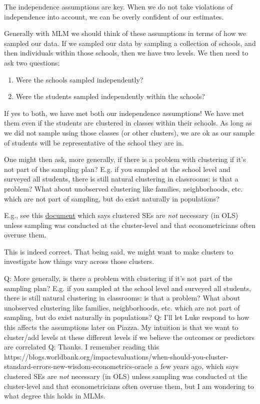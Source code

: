 \documentclass[
  letterpaper,
  DIV=11,
  numbers=noendperiod]{scrreprt}
\begin{document}
The independence assumptions are key. When we do not take violations of
independence into account, we can be overly confident of our estimates.

Generally with MLM we should think of these assumptions in terms of how
we sampled our data. If we sampled our data by sampling a collection of
schools, and then individuals within those schools, then we have two
levels. We then need to ask two questions:

\begin{enumerate}
\def\labelenumi{(\arabic{enumi})}
\item
  Were the schools sampled independently?
\item
  Were the students sampled independently within the schools?
\end{enumerate}

If yes to both, we have met both our independence assumptions! We have
met them even if the students are clustered in classes within their
schools. As long as we did not sample using those classes (or other
clusters), we are ok as our sample of students will be representative of
the school they are in.

One might then ask, more generally, if there is a problem with
clustering if it's not part of the sampling plan? E.g. if you sampled at
the school level and surveyed all students, there is still natural
clustering in classrooms: is that a problem? What about unobserved
clustering like families, neighborhoods, etc. which are not part of
sampling, but do exist naturally in populations?

E.g., see this
\href{https://blogs.worldbank.org/impactevaluations/when-should-you-cluster-standard-errors-new-wisdom-econometrics-oracle}{document}
which says clustered SEs are \emph{not} necessary (in OLS) unless
sampling was conducted at the cluster-level and that econometricians
often overuse them.

This is indeed correct. That being said, we might want to make clusters
to investigate how things vary across those clusters.

Q: More generally, is there a problem with clustering if it's not part
of the sampling plan? E.g. if you sampled at the school level and
surveyed all students, there is still natural clustering in classrooms:
is that a problem? What about unobserved clustering like families,
neighborhoods, etc. which are not part of sampling, but do exist
naturally in populations? Q: I'll let Luke respond to how this affects
the assumptions later on Piazza. My intuition is that we want to
cluster/add levels at these different levels if we believe the outcomes
or predictors are correlated Q: Thanks. I remember reading this
https://blogs.worldbank.org/impactevaluations/when-should-you-cluster-standard-errors-new-wisdom-econometrics-oracle
a few years ago, which says clustered SEs are \emph{not} necessary (in
OLS) unless sampling was conducted at the cluster-level and that
econometricians often overuse them, but I am wondering to what degree
this holds in MLMs.
\end{document}
